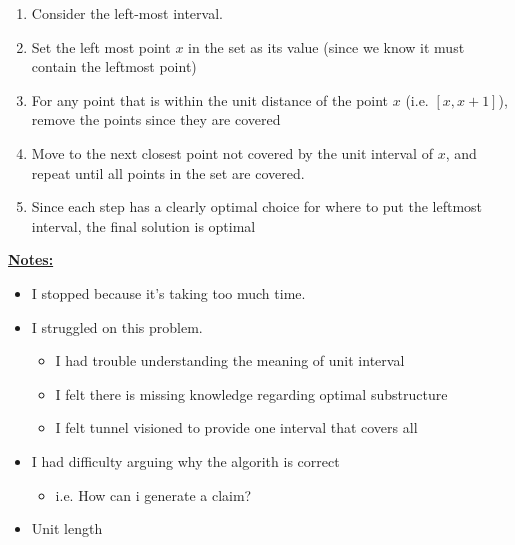 \documentclass[12pt]{article}
\begin{document}
\begin{enumerate}[1.]
\begin{mdframed}
        \color{red}
        \begin{enumerate}[1)]
            \item Consider the left-most interval.
            \item Set the left most point $x$ in the set as its value (since we know it must contain the leftmost point)
            \item For any point that is within the unit distance of the point $x$ (i.e. $[x, x+1]$), remove the points
            since they are covered
            \item Move to the next closest point not covered by the unit interval of $x$, and repeat until all points in the set are covered.
            \item Since each step has a clearly optimal choice for where to put the leftmost interval, the final solution is optimal
        \end{enumerate}

        \color{black}

        \bigskip

    \end{mdframed}

    \underline{\textbf{Notes:}}

    \bigskip

    \begin{itemize}
        \item I stopped because it's taking too much time.
        \item I struggled on this problem.

        \begin{itemize}
            \item I had trouble understanding the meaning of unit interval
            \item I felt there is missing knowledge regarding optimal substructure
            \item I felt tunnel visioned to provide one interval that covers all
        \end{itemize}

        \item I had difficulty arguing why the algorith is correct

        \begin{itemize}
            \item i.e. How can i generate a claim?
        \end{itemize}

        \item Unit length


\end{itemize}
\end{enumerate}
\end{document}
